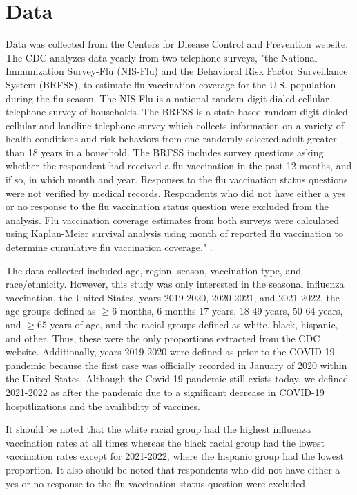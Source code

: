 \documentclass[12pt]{article}
\begin{document}
\section{Data}
\label{sec:data}
Data was collected from the Centers for Disease Control and Prevention website. The CDC analyzes data yearly from two telephone surveys, 
"the National Immunization Survey-Flu (NIS-Flu) and the Behavioral Risk Factor Surveillance System (BRFSS), to estimate flu vaccination 
coverage for the U.S. population during the flu season. The NIS-Flu is a national random-digit-dialed cellular telephone survey of households.
The BRFSS is a state-based random-digit-dialed cellular and landline telephone survey which collects information on a variety of health conditions 
and risk behaviors from one randomly selected adult greater than 18 years in a household. The BRFSS includes survey questions asking whether the respondent had 
received a flu vaccination in the past 12 months, and if so, in which month and year. Responses to the flu vaccination status questions were not verified by medical records. 
Respondents who did not have either a yes or no response to the flu vaccination status question were excluded from the analysis. Flu vaccination coverage estimates from both surveys 
were calculated using Kaplan-Meier survival analysis using month of reported flu vaccination to determine cumulative flu vaccination coverage." \citep{cdc_2021}. \par
The data collected included age, region, season, vaccination type, and race/ethnicity. However, this study was only interested in the seasonal influenza vaccination, the United States,
years 2019-2020, 2020-2021, and 2021-2022, the age groups defined as $\ge6$ months, 6 months-17 years, 18-49 years, 50-64 years, and $\ge 65$ years of age, and the racial groups defined
as white, black, hispanic, and other. Thus, these were the only proportions extracted from the CDC website. Additionally, years 2019-2020 were defined as prior to the COVID-19 pandemic 
because the first case was officially recorded in January of 2020 within the United States. Although the Covid-19 pandemic still exists today, we defined 2021-2022 as after the pandemic
due to a significant decrease in COVID-19 hospitlizations and the availibility of vaccines.\par
It should be noted that the white racial group had the highest influenza vaccination rates at all times whereas the black racial group had the lowest vaccination rates except for 2021-2022, 
where the hispanic group had the lowest proportion. It also should be noted that respondents who did not have either a yes or no response to the flu vaccination status question were excluded 
\end{document}
